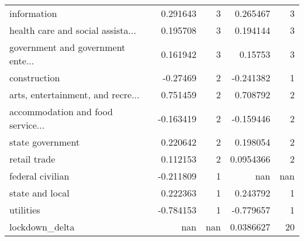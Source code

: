 \begin{tabular}{lrrrr}
 information                       &            0.291643    &                      3 &            0.265467    &                      3 \\
 health care and social assista... &            0.195708    &                      3 &            0.194144    &                      3 \\
 government and government ente... &            0.161942    &                      3 &            0.15753     &                      3 \\
 construction                      &           -0.27469     &                      2 &           -0.241382    &                      1 \\
 arts, entertainment, and recre... &            0.751459    &                      2 &            0.708792    &                      2 \\
 accommodation and food service... &           -0.163419    &                      2 &           -0.159446    &                      2 \\
 state government                  &            0.220642    &                      2 &            0.198054    &                      2 \\
 retail trade                      &            0.112153    &                      2 &            0.0954366   &                      2 \\
 federal civilian                  &           -0.211809    &                      1 &          nan           &                    nan \\
 state and local                   &            0.222363    &                      1 &            0.243792    &                      1 \\
 utilities                         &           -0.784153    &                      1 &           -0.779657    &                      1 \\
 lockdown\_delta                    &          nan           &                    nan &            0.0386627   &                     20 \\
\hline
\end{tabular}